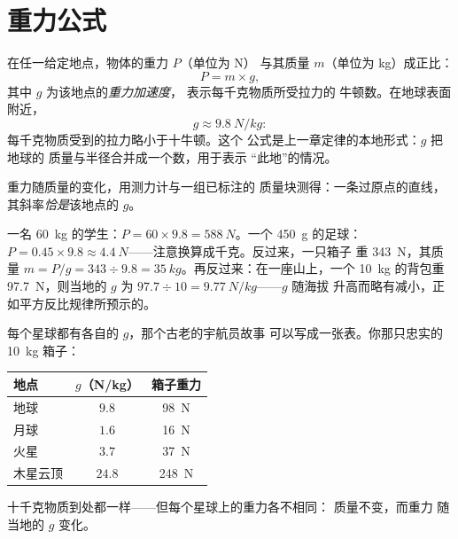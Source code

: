 \section{重力公式}

\begin{proposition}[重力与质量成正比]\label{prop:g9:weight-vs-mass:formula}
在任一给定地点，物体的重力 $P$（单位为 \unit{N}）
与其质量 $m$（单位为 \unit{kg}）成正比：
\[
P = m \times g ,
\]
其中 $g$ 为该地点的\emph{重力加速度}，
表示每千克物质所受拉力的
牛顿数。在地球表面附近，
\[
g \approx \qty{9.8}{N/kg}:
\]
每千克物质受到的拉力略小于十牛顿。这个
公式是上一章定律的本地形式：$g$ 把地球的
质量与半径合并成一个数，用于表示
“此地”的情况。
\end{proposition}

\begin{omfigure}

{\small 重力随质量的变化，用测力计与一组已标注的
质量块测得：一条过原点的直线，
其斜率\emph{恰是}该地点的 $g$。}
\end{omfigure}

\begin{example}[公式的应用]\label{ex:g9:weight-vs-mass:atwork}
一名 \qty{60}{kg} 的学生：$P = 60 \times 9.8 = \qty{588}{N}$。一个
\qty{450}{g} 的足球：$P = 0.45 \times 9.8 \approx
\qty{4.4}{N}$——注意换算成千克。反过来，一只箱子
重 \qty{343}{N}，其质量 $m = P/g = 343 \div 9.8 =
\qty{35}{kg}$。再反过来：在一座山上，一个
\qty{10}{kg} 的背包重 \qty{97.7}{N}，则当地的 $g$ 为
$97.7 \div 10 = \qty{9.77}{N/kg}$——$g$ 随海拔
升高而略有减小，正如平方反比规律所预示的。
\end{example}

\begin{example}\label{ex:g9:weight-vs-mass:planets}
每个星球都有各自的 $g$，那个古老的宇航员故事
可以写成一张表。你那只忠实的 \qty{10}{kg} 箱子：
\begin{center}
\begin{tabular}{l|c|c}
地点 & $g$（\unit{N/kg}）& 箱子重力 \\
\hline
地球 & $9.8$ & \qty{98}{N} \\
月球 & $1.6$ & \qty{16}{N} \\
火星 & $3.7$ & \qty{37}{N} \\
木星云顶 & $24.8$ & \qty{248}{N}
\end{tabular}
\end{center}
十千克物质到处都一样——但每个星球上的重力各不相同：
质量不变，而重力
随当地的 $g$ 变化。
\end{example}

